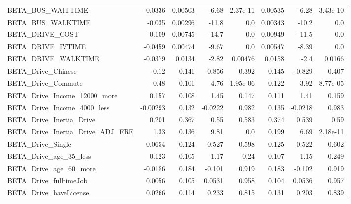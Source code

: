 \begin{tabular}{lrrrrrrr}
BETA\_BUS\_WAITTIME                &  -0.0336 &  0.00503 &   -6.68 & 2.37e-11 &       0.00535 &        -6.28 &      3.43e-10 \\
BETA\_BUS\_WALKTIME                &   -0.035 &  0.00296 &   -11.8 &      0.0 &       0.00343 &        -10.2 &           0.0 \\
BETA\_DRIVE\_COST                  &   -0.109 &  0.00745 &   -14.7 &      0.0 &       0.00949 &        -11.5 &           0.0 \\
BETA\_DRIVE\_IVTIME                &  -0.0459 &  0.00474 &   -9.67 &      0.0 &       0.00547 &        -8.39 &           0.0 \\
BETA\_DRIVE\_WALKTIME              &  -0.0379 &   0.0134 &   -2.82 &  0.00476 &        0.0158 &         -2.4 &        0.0166 \\
BETA\_Drive\_Chinese               &    -0.12 &    0.141 &  -0.856 &    0.392 &         0.145 &       -0.829 &         0.407 \\
BETA\_Drive\_Commute               &     0.48 &    0.101 &    4.76 & 1.95e-06 &         0.122 &         3.92 &      8.77e-05 \\
BETA\_Drive\_Income\_12000\_more     &    0.157 &    0.108 &    1.45 &    0.147 &         0.111 &         1.41 &         0.159 \\
BETA\_Drive\_Income\_4000\_less      & -0.00293 &    0.132 & -0.0222 &    0.982 &         0.135 &      -0.0218 &         0.983 \\
BETA\_Drive\_Inertia\_Drive         &    0.201 &    0.367 &    0.55 &    0.583 &         0.374 &        0.539 &          0.59 \\
BETA\_Drive\_Inertia\_Drive\_ADJ\_FRE &     1.33 &    0.136 &    9.81 &      0.0 &         0.199 &         6.69 &      2.18e-11 \\
BETA\_Drive\_Single                &   0.0654 &    0.124 &   0.527 &    0.598 &         0.125 &        0.522 &         0.602 \\
BETA\_Drive\_age\_35\_less           &    0.123 &    0.105 &    1.17 &     0.24 &         0.107 &         1.15 &         0.249 \\
BETA\_Drive\_age\_60\_more           &  -0.0186 &    0.184 &  -0.101 &    0.919 &         0.183 &       -0.102 &         0.919 \\
BETA\_Drive\_fulltimeJob           &   0.0056 &    0.105 &  0.0531 &    0.958 &         0.104 &       0.0536 &         0.957 \\
BETA\_Drive\_haveLicense           &   0.0266 &    0.114 &   0.233 &    0.815 &         0.131 &        0.203 &         0.839 \\

\end{tabular}

